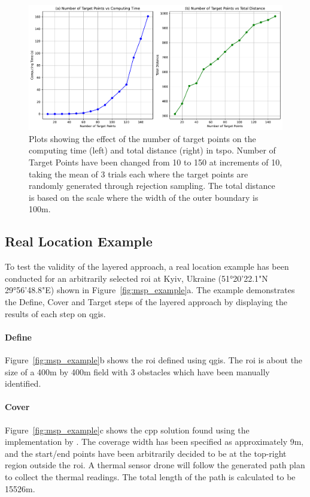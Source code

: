 \begin{figure}[h!]
    \centering
    \includegraphics[width=\linewidth]{figs/Jihwan/target_points_vs.pdf}
    \caption[Effect of Number of Target Points on Computing Time and Total Distance of TSP-O Solution]
    {Plots showing the effect of the number of target points on the computing time (left) and total distance (right) in \gls{tspo}. Number of Target Points have been changed from 10 to 150 at increments of 10, taking the mean of 3 trials each where the target points are randomly generated through rejection sampling. The total distance is based on the scale where the width of the outer boundary is 100m.}
    \label{fig:msp_tspo_plot}
\end{figure}

\subsection{Real Location Example}
\label{sec:msp_example}

To test the validity of the layered approach, a real location example has been conducted for an arbitrarily selected \gls{roi} at Kyiv, Ukraine (51°20'22.1"N 29°56'48.8"E) shown in Figure~\ref{fig:msp_example}a. The example demonstrates the Define, Cover and Target steps of the layered approach by displaying the results of each step on \gls{qgis}. 

\paragraph{Define} Figure~\ref{fig:msp_example}b shows the \gls{roi} defined using \gls{qgis}. The \gls{roi} is about the size of a 400m by 400m field with 3 obstacles which have been manually identified.  

\paragraph{Cover} Figure~\ref{fig:msp_example}c shows the \gls{cpp} solution found using the implementation by \cite{bahnemann2021cpp}. The coverage width has been specified as approximately 9m, and the start/end points have been arbitrarily decided to be at the top-right region outside the \gls{roi}. A thermal sensor drone will follow the generated path plan to collect the thermal readings. The total length of the path is calculated to be 15526m.

